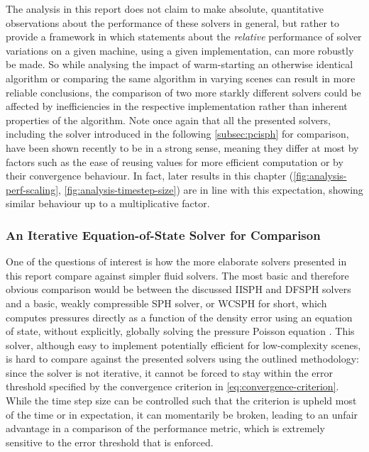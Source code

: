 \documentclass[oneside, a4paper]{book}
\begin{document}
  
  The analysis in this report does not claim to make absolute, quantitative observations about the performance of these solvers in general, but rather to provide a framework in which statements about the \textit{relative} performance of solver variations on a given machine, using a given implementation, can more robustly be made. So while analysing the impact of warm-starting an otherwise identical algorithm or comparing the same algorithm in varying scenes can result in more reliable conclusions, the comparison of two more starkly different solvers could be affected by inefficiencies in the respective implementation rather than inherent properties of the algorithm. Note once again that all the presented solvers, including the solver introduced in the following \autoref{subsec:pcisph} for comparison, have been shown recently to be \autocite[equivalent]{2022-survey-equographics-star} in a strong sense, meaning they differ at most by factors such as the ease of reusing values for more efficient computation or by their convergence behaviour. In fact, later results in this chapter (\autoref{fig:analysis-perf-scaling}, \autoref{fig:analysis-timestep-size}) are in line with this expectation, showing similar behaviour up to a multiplicative factor.
  
  \subsubsection{An Iterative Equation-of-State Solver for Comparison}\label{subsec:pcisph}
  One of the questions of interest is how the more elaborate solvers presented in this report compare against simpler fluid solvers. The most basic and therefore obvious comparison would be between the discussed IISPH and DFSPH solvers and a basic, weakly compressible SPH solver, or WCSPH for short, which computes pressures directly as a function of the density error using an equation of state, without explicitly, globally solving the pressure Poisson equation \autocite{wcsph}. This solver, although easy to implement potentially efficient for low-complexity scenes, is hard to compare against the presented solvers using the outlined methodology: since the solver is not iterative, it cannot be forced to stay within the error threshold specified by the convergence criterion in \autoref{eq:convergence-criterion}. While the time step size can be controlled such that the criterion is upheld most of the time or in expectation, it can momentarily be broken, leading to an unfair advantage in a comparison of the performance metric, which is extremely sensitive to the error threshold that is enforced. 
  
\end{document}
